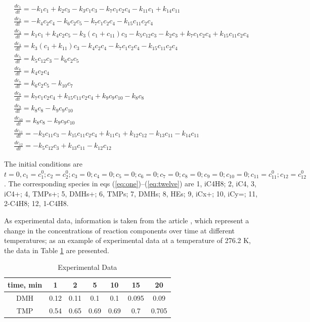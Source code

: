 \documentclass{svproc}
\begin{document}
\begin{gather}
  \frac{dc_1}{dt} = -k_1c_1 + k_2c_3 - k_3c_1c_3 - k_7c_1c_2c_4 - k_{11}c_1 + k_{14}c_{11} \label{eq:one} \\
  \frac{dc_2}{dt} = -k_4c_2c_4 - k_6c_2c_5 - k_7c_1c_2c_4 - k_{15}c_{11}c_2c_4 \label{eq:two} \\
  \frac{dc_3}{dt} = k_1c_1 + k_4c_2c_5 - k_3(c_1 + c_{11})c_3 - k_{5}c_{12}c_3 - k_2c_3 + k_7c_1c_2c_4 + k_{15}c_{11}c_2c_4 \label{eq:three} \\
  \frac{dc_4}{dt} = k_3(c_1 + k_{11})c_3 - k_4c_2c_4 - k_{7}c_{1}c_2c_4 - k_{15}c_{11}c_2c_4 \label{eq:four} \\
  \frac{dc_5}{dt} = k_5c_{12}c_3 - k_{6}c_2c_5 \label{eq:five} \\
  \frac{dc_6}{dt} = k_4c_{2}c_4 \label{eq:six} \\
  \frac{dc_7}{dt} = k_6c_{2}c_5 - k_{10}c_7 \label{eq:seven} \\
  \frac{dc_8}{dt} = k_7c_{1}c_2c_4 + k_{15}c_{11}c_2c_4 + k_9c_9c_{10} - k_8c_8 \label{eq:eight} \\
  \frac{dc_9}{dt} = k_8c_{8} - k_{9}c_{9}c_{10} \label{eq:nine} \\
  \frac{dc_{10}}{dt} = k_8c_{8} - k_{9}c_{9}c_{10} \label{eq:ten} \\
  \frac{dc_{11}}{dt} = -k_3c_{11}c_3 - k_{15}c_{11}c_{2}c_4 + k_{11}c_1 + k_{12}c_{12} - k_{13}c_{11} - k_{14}c_{11} \label{eq:eleven} \\
  \frac{dc_{12}}{dt} = -k_5c_{12}c_3 + k_{13}c_{11} - k_{12}c_{12} \label{eq:twelve} 
\end{gather}

The initial conditions are $t = 0, c_1 = c_1^0; c_2=c_2^0; c_3 = 0; c_4 = 0; c_5= 0; c_6 = 0; c_7 = 0; c_8 = 0; c_9 = 0; c_{10} = 0; c_{11}=c_{11}^0; c_{12} = c_{12}^0$.
The corresponding species in eqs (\ref{eq:one})--(\ref{eq:twelve}) are 1, iC4H8; 2, iC4, 3, iC4+; 4, TMPs+; 5, DMHs+; 6, TMPs; 7, DMHs; 8, HEs; 9, iCx+; 10, iCy=; 11, 2-C4H8; 12, 1-C4H8.

As experimental data, information is taken from the article \cite{cao2019}, which represent a change in the concentrations of reaction components over time at different temperatures; as an example of experimental data at a temperature of 276.2 K, the data in Table \ref{table1} are presented.

\begin{table}
\caption{Experimental Data}
\label{table1}
\begin{center}
\begin{tabular}{ccccccc}
\hline
time, min & 1 & 2 & 5 & 10 & 15 & 20 \\
\hline\rule{0pt}{12pt}
DMH & 0.12 & 0.11 & 0.1	& 0.1 &	0.095 &	0.09  \\
TMP & 0.54 & 0.65 & 0.69 & 0.69 & 0.7 & 0.705 \\[2pt]
\hline
\end{tabular}
\end{center}
\end{table}
\end{document}
